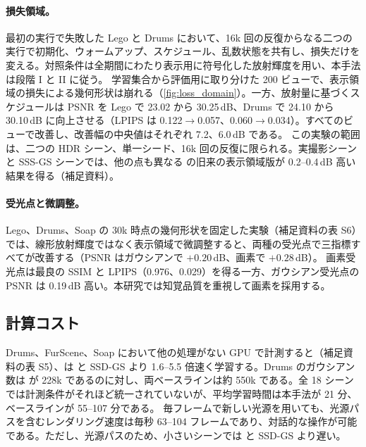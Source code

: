 \paragraph{損失領域。}
最初の実行で失敗した Lego と Drums において、16k 回の反復からなる二つの実行で初期化、ウォームアップ、スケジュール、乱数状態を共有し、損失だけを変える。対照条件は全期間にわたり表示用に符号化した放射輝度を用い、本手法は段階 I と II に従う。
学習集合から評価用に取り分けた 200 ビューで、表示領域の損失による幾何形状は崩れる（\cref{fig:loss_domain}）。一方、放射量に基づくスケジュールは PSNR を Lego で 23.02 から 30.25\,dB、Drums で 24.10 から 30.10\,dB に向上させる（LPIPS は 0.122$\to$0.057、0.060$\to$0.034）。すべてのビューで改善し、改善幅の中央値はそれぞれ 7.2、6.0\,dB である。
この実験の範囲は、二つの HDR シーン、単一シード、16k 回の反復に限られる。実撮影シーンと SSS-GS シーンでは、他の点も異なる \ours の旧来の表示領域版が 0.2--0.4\,dB 高い結果を得る（補足資料）。

\paragraph{受光点と微調整。}
Lego、Drums、Soap の 30k 時点の幾何形状を固定した実験（補足資料の表 S6）では、線形放射輝度ではなく表示領域で微調整すると、両種の受光点で三指標すべてが改善する（PSNR はガウシアンで $+0.20$\,dB、画素で $+0.28$\,dB）。
画素受光点は最良の SSIM と LPIPS（0.976、0.029）を得る一方、ガウシアン受光点の PSNR は 0.19\,dB 高い。本研究では知覚品質を重視して画素を採用する。

\subsection{計算コスト}
\label{sec:exp_cost}
Drums、FurScene、Soap において他の処理がない GPU で計測すると（補足資料の表 S5）、\ours は \gsthree と SSD-GS より 1.6--5.5 倍速く学習する。Drums のガウシアン数は \ours が 228k であるのに対し、両ベースラインは約 550k である。全 18 シーンでは計測条件がそれほど統一されていないが、平均学習時間は本手法が 21 分、ベースラインが 55--107 分である。
毎フレームで新しい光源を用いても、光源パスを含むレンダリング速度は毎秒 63--104 フレームであり、対話的な操作が可能である。ただし、光源パスのため、小さいシーンでは \gsthree と SSD-GS より遅い。

